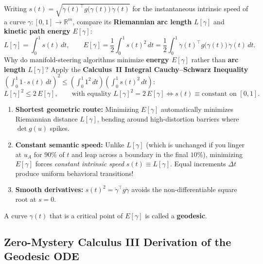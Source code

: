 \documentclass[11pt,a4paper]{article}
\newcommand{\R}{\mathbb{R}}
\theoremstyle{definition}
\begin{document}
Writing $s(t) = \sqrt{\dot{\gamma}(t)^\top g\bigl(\gamma(t)\bigr)\,\dot{\gamma}(t)}$ for the instantaneous intrinsic speed of a curve $\gamma : [0, 1] \to \R^m$, compare its \textbf{Riemannian arc length} $L[\gamma]$ and \textbf{kinetic path energy} $E[\gamma]$:
\begin{equation}
    L[\gamma] = \int_0^1 s(t)\,dt,
    \qquad
    E[\gamma] = \frac{1}{2}\int_0^1 s(t)^2\,dt = \frac{1}{2}\int_0^1 \dot{\gamma}(t)^\top g\bigl(\gamma(t)\bigr)\,\dot{\gamma}(t)\,dt.
    \label{eq:length-energy}
\end{equation}
Why do manifold-steering algorithms minimize \textbf{energy $E[\gamma]$} rather than \textbf{arc length $L[\gamma]$}? Apply the \textbf{Calculus~II Integral Cauchy--Schwarz Inequality} $\left(\int_0^1 1 \cdot s(t)\,dt\right)^2 \le \left(\int_0^1 1^2\,dt\right)\left(\int_0^1 s(t)^2\,dt\right)$:
\begin{equation}
    L[\gamma]^2 \le 2\,E[\gamma], \qquad \text{with equality } L[\gamma]^2 = 2\,E[\gamma] \iff s(t) \equiv \text{constant on } [0, 1].
    \label{eq:cauchy-schwarz}
\end{equation}

\begin{keyidea}
\begin{enumerate}[leftmargin=*,nosep]
    \item \textbf{Shortest geometric route:} Minimizing $E[\gamma]$ automatically minimizes Riemannian distance $L[\gamma]$, bending around high-distortion barriers where $\det g(u)$ spikes.
    \item \textbf{Constant semantic speed:} Unlike $L[\gamma]$ (which is unchanged if you linger at $u_A$ for $90\%$ of $t$ and leap across a boundary in the final $10\%$), minimizing $E[\gamma]$ forces \emph{constant intrinsic speed} $s(t) \equiv L[\gamma]$. Equal increments $\Delta t$ produce uniform behavioral transitions!
    \item \textbf{Smooth derivatives:} $s(t)^2 = \dot{\gamma}^\top g \dot{\gamma}$ avoids the non-differentiable square root at $s = 0$.
\end{enumerate}
\end{keyidea}

A curve $\gamma(t)$ that is a critical point of $E[\gamma]$ is called a \textbf{geodesic}.

\subsection{Zero-Mystery Calculus III Derivation of the Geodesic ODE}
\end{document}
